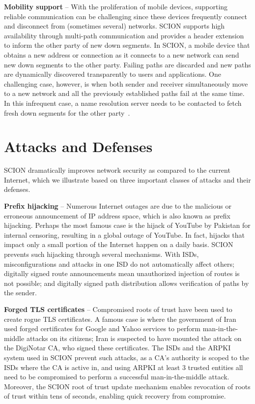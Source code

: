 \documentclass[a4paper]{llncs}
\newcommand\SCION{{\small\textsf{SCION}}\xspace}
\begin{document}
\textbf{Mobility support} --
With the proliferation of mobile devices, supporting reliable communication can
be challenging since these devices frequently connect and disconnect from 
(sometimes several) networks. \SCION supports high availability through 
multi-path communication and provides a header extension to inform the other
party of new down segments. In \SCION,
a mobile device that obtains a new address or connection as it connects to
a new network can send new down segments to the other party.
Failing paths are discarded and new paths are dynamically discovered
transparently
to users and applications. One challenging case, however, is when both sender and 
receiver simultaneously move to a 
new network and all the previously established paths fail at the same time. In 
this infrequent case, a name resolution server needs to be contacted to fetch
fresh down segments for the other party~\cite{STUVWY2014}.


 

\section{Attacks and Defenses}

\SCION dramatically improves network security as compared to the current
Internet, which we illustrate based on three important classes of attacks and their defenses.

\textbf{Prefix hijacking} -- Numerous Internet outages are due to the malicious or
erroneous announcement of IP address space, which is also known as prefix
hijacking. Perhaps the most famous case is the hijack of YouTube by Pakistan for
internal censoring, resulting in a global outage of YouTube. In fact, hijacks
that impact only a small portion of the Internet happen on a daily basis. \SCION
prevents such hijacking through several mechanisms. With ISDs, misconfigurations and attacks in 
one ISD do not automatically affect others; digitally signed route 
announcements mean unauthorized injection of routes is not possible; and
digitally signed path distribution allows verification of paths by the sender.

\textbf{Forged TLS certificates} -- Compromised roots of trust have been used to
create rogue TLS certificates. A famous case is where the government of Iran
used forged certificates for Google and Yahoo services to perform
man-in-the-middle attacks on its citizens; Iran is suspected to have mounted
the attack on the DigiNotar CA, who signed these certificates. The ISDs and the
ARPKI system used in \SCION prevent such attacks, as a CA's authority is scoped to
the ISDs where the CA is active in, and using ARPKI at least 3 trusted entities
all need to be compromised to perform a successful man-in-the-middle attack.
Moreover, the \SCION root of trust update mechanism enables revocation of roots
of trust within tens of seconds, enabling quick recovery from
compromise.
\end{document}
